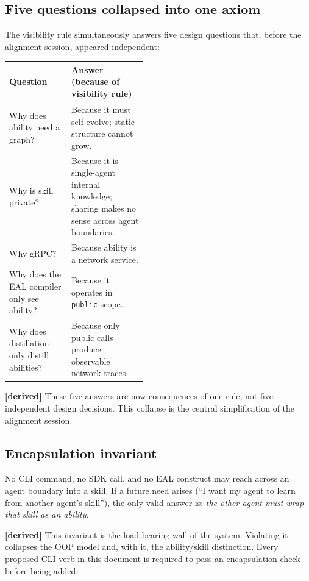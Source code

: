\documentclass[11pt,a4paper]{article}
\newcommand{\derived}{\textcolor{derivedcolor}{\textbf{[derived]}}\xspace}
\begin{document}
\subsection{Five questions collapsed into one axiom}
\label{sec:five-into-one}

The visibility rule simultaneously answers five design questions that, before
the alignment session, appeared independent:

\begin{center}
\renewcommand{\arraystretch}{1.25}
\begin{tabularx}{\linewidth}{L{0.45\linewidth} X}
\toprule
\textbf{Question} & \textbf{Answer (because of visibility rule)} \\
\midrule
Why does ability need a graph? &
Because it must self-evolve; static structure cannot grow. \\
Why is skill private? &
Because it is single-agent internal knowledge; sharing makes no sense across
agent boundaries. \\
Why gRPC? &
Because ability is a network service. \\
Why does the EAL compiler only see ability? &
Because it operates in \texttt{public} scope. \\
Why does distillation only distill abilities? &
Because only public calls produce observable network traces. \\
\bottomrule
\end{tabularx}
\end{center}

\derived{} These five answers are now consequences of one rule, not five
independent design decisions. This collapse is the central simplification of
the alignment session.

\subsection{Encapsulation invariant}

\begin{invariant}
No CLI command, no SDK call, and no EAL construct may reach across an agent
boundary into a skill. If a future need arises (``I want my agent to learn
from another agent's skill''), the only valid answer is: \emph{the other agent
must wrap that skill as an ability.}
\end{invariant}

\derived{} This invariant is the load-bearing wall of the system. Violating it
collapses the OOP model and, with it, the ability/skill distinction. Every
proposed CLI verb in this document is required to pass an encapsulation
check before being added.
\end{document}
